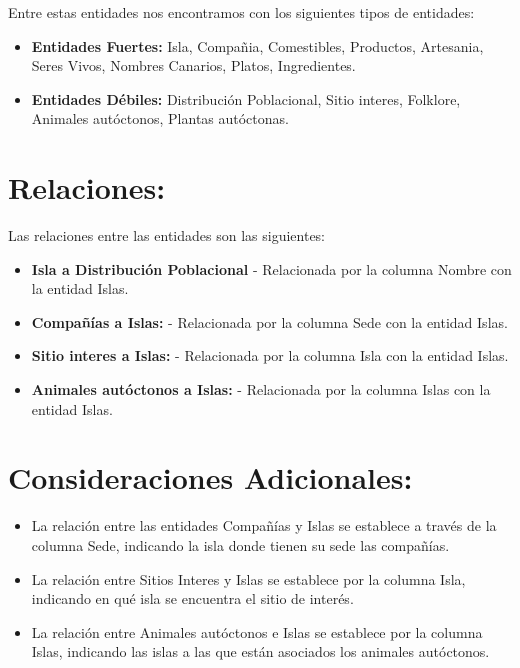 \documentclass[11pt]{report}
\begin{document}
Entre estas entidades nos encontramos con los siguientes tipos de entidades:
\begin{itemize}
      \item \textbf{Entidades Fuertes:} Isla, Compañia, Comestibles, Productos, Artesania, Seres Vivos, Nombres Canarios, Platos, Ingredientes.
      \item \textbf{Entidades Débiles:} Distribución Poblacional, Sitio interes, Folklore, Animales autóctonos, Plantas autóctonas.
\end{itemize}

\section{Relaciones:}
Las relaciones entre las entidades son las siguientes:
\begin{itemize}
      \item \textbf{Isla a Distribución Poblacional}
            \subitem - Relacionada por la columna Nombre con la entidad Islas.

      \item \textbf{Compañías a Islas:}
            \subitem - Relacionada por la columna Sede con la entidad Islas.

      \item \textbf{Sitio interes a Islas:}
            \subitem - Relacionada por la columna Isla con la entidad Islas.

      \item \textbf{Animales autóctonos a Islas:}
            \subitem - Relacionada por la columna Islas con la entidad Islas.
\end{itemize}

\section{Consideraciones Adicionales:}

\begin{itemize}
      \item La relación entre las entidades Compañías y Islas se establece a través de la columna Sede, indicando la isla donde tienen su sede las compañías.
      \item La relación entre Sitios Interes y Islas se establece por la columna Isla, indicando en qué isla se encuentra el sitio de interés.
      \item La relación entre Animales autóctonos e Islas se establece por la columna Islas, indicando las islas a las que están asociados los animales autóctonos.
\end{itemize}
\end{document}
